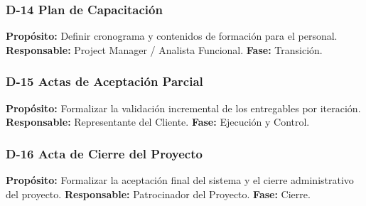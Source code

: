 \subsubsection*{D-14 Plan de Capacitación}
\textbf{Propósito:} Definir cronograma y contenidos de formación para el personal.  
\textbf{Responsable:} Project Manager / Analista Funcional.  
\textbf{Fase:} Transición.

\subsubsection*{D-15 Actas de Aceptación Parcial}
\textbf{Propósito:} Formalizar la validación incremental de los entregables por iteración.  
\textbf{Responsable:} Representante del Cliente.  
\textbf{Fase:} Ejecución y Control.

\subsubsection*{D-16 Acta de Cierre del Proyecto}
\textbf{Propósito:} Formalizar la aceptación final del sistema y el cierre administrativo del proyecto.  
\textbf{Responsable:} Patrocinador del Proyecto.  
\textbf{Fase:} Cierre.